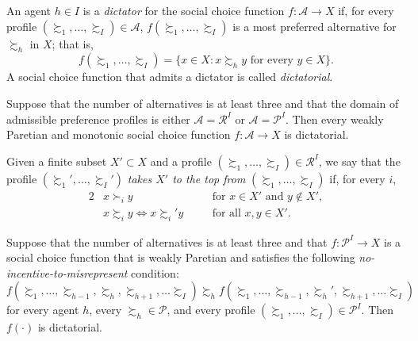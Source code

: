 \begin{defn}
    An agent $h \in I$ is a \emph{dictator} for the social choice function $f : \mathscr{A} \to X$ if, for every profile $(\succsim_1, \dots, \succsim_I) \in \mathscr{A}$, $f (\succsim_1, \dots, \succsim_I)$ is a most preferred alternative for $\succsim_h$ in $X$; that is,
    \begin{equation*}
        f (\succsim_1, \dots, \succsim_I) = \{x \in X : x \succsim_h y \text{ for every } y \in X\}.
    \end{equation*}
    A social choice function that admits a dictator is called \emph{dictatorial}.
\end{defn}

\begin{prop}
    Suppose that the number of alternatives is at least three and that the domain of admissible preference profiles is either $\mathscr{A} = \mathscr{R}^I$ or $\mathscr{A} = \mathscr{P}^I$. Then every weakly Paretian and monotonic social choice function $f : \mathscr{A} \to X$ is dictatorial.
\end{prop}

\begin{defn}
    Given a finite subset $X' \subset X$ and a profile $(\succsim_1, \dots, \succsim_I) \in \mathscr{R}^I$, we say that the profile $(\succsim_1', \dots, \succsim_I')$ \emph{takes $X'$ to the top from} $(\succsim_1, \dots, \succsim_I)$ if, for every $i$,
    \begin{alignat*}{2}
        &x \succ_i y && \text{for } x \in X' \text{ and } y \not\in X', \\
        &x \succsim_i y \iff x \succsim_i' y \quad && \text{for all } x, y \in X'.
    \end{alignat*}
\end{defn}

\begin{prop}
    Suppose that the number of alternatives is at least three and that $f : \mathscr{P}^I \to X$ is a social choice function that is weakly Paretian and satisfies the following \emph{no-incentive-to-misrepresent} condition:
    \begin{equation*}
        f (\succsim_1, \dots, \succsim_{h - 1}, \succsim_h, \succsim_{h + 1}, \dots \succsim_I) \succsim_h f (\succsim_1, \dots, \succsim_{h - 1}, \succsim_h', \succsim_{h + 1}, \dots \succsim_I)
    \end{equation*}
    for every agent $h$, every $\succsim_h \in \mathscr{P}$, and every profile $(\succsim_1, \dots, \succsim_I) \in \mathscr{P}^I$. Then $f(\cdot)$ is dictatorial.
\end{prop}
